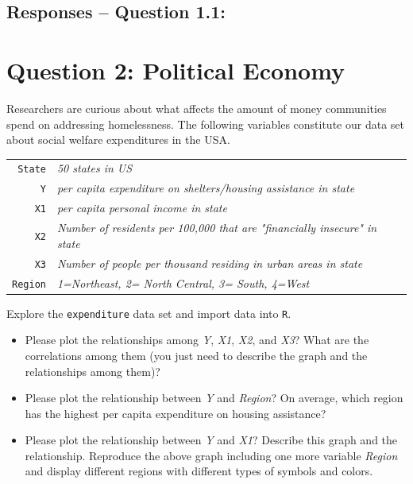 \documentclass[12pt,letterpaper]{article}
\begin{document}
\subsection{Responses -- Question 1.1:}

\vspace{.25cm}

\vspace{.25cm}

\newpage

	\section*{Question 2: Political Economy}

\noindent Researchers are curious about what affects the amount of money communities spend on addressing homelessness. The following variables constitute our data set about social welfare expenditures in the USA. \\
\vspace{.5cm}


\begin{tabular}{r|l}
	\texttt{State} &\emph{50 states in US} \\
	\texttt{Y} & \emph{per capita expenditure on shelters/housing assistance in state}\\
	\texttt{X1} &\emph{per capita personal income in state} \\
	\texttt{X2} &  \emph{Number of residents per 100,000 that are "financially insecure" in state}\\
	\texttt{X3} &  \emph{Number of people per thousand residing in urban areas in state} \\
	\texttt{Region} &  \emph{1=Northeast, 2= North Central, 3= South, 4=West} \\
\end{tabular}

\vspace{.5cm}
\noindent Explore the \texttt{expenditure} data set and import data into \texttt{R}.
\vspace{.5cm}
  
\vspace{.5cm}
\begin{itemize}

\item
Please plot the relationships among \emph{Y}, \emph{X1}, \emph{X2}, and \emph{X3}? What are the correlations among them (you just need to describe the graph and the relationships among them)?
\vspace{.5cm}
\item
Please plot the relationship between \emph{Y} and \emph{Region}? On average, which region has the highest per capita expenditure on housing assistance?
\vspace{.5cm}
\item
Please plot the relationship between \emph{Y} and \emph{X1}? Describe this graph and the relationship. Reproduce the above graph including one more variable \emph{Region} and display different regions with different types of symbols and colors.
\end{itemize}
\end{document}
